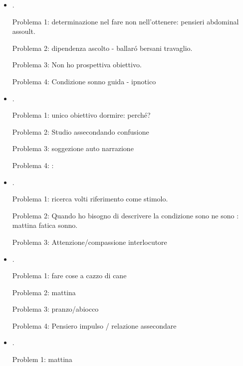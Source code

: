 \begin{itemize}
Problema 2: distrazione studio son bravo (obiettivo determinazione)

Problema 3: addormentarsi in coma. Workout dopo che mi \'e passato il mal di testa: stanchezza reflusso acidit\'a - cena con leggera stanchezza confusione mentale- mi sdraio sul divano: palpitazioni sensazione angoscia.

\item {}.

Problema 1: determinazione nel fare non nell'ottenere: pensieri abdominal assoult.

Problema 2: dipendenza ascolto - ballar\'o bersani travaglio.

Problema 3: Non ho prospettiva obiettivo.

Problema 4: Condizione sonno guida - ipnotico


\item {}.

Problema 1: unico obiettivo dormire: perch\'e?

Problema 2: Studio assecondando confusione

Problema 3: soggezione auto narrazione 

Problema 4: : 

\item {}.

Problema 1: ricerca volti riferimento come stimolo.

Problema 2: Quando ho bisogno di descrivere la condizione sono ne sono  : mattina fatica sonno.

Problema 3: Attenzione/compassione interlocutore

\item {}.

Problema 1: fare cose a cazzo di cane

Problema 2: mattina

Problema 3: pranzo/abiocco

Problema 4: Pensiero impulso / relazione assecondare

\item {}.

Problem 1: mattina


\end{itemize}
